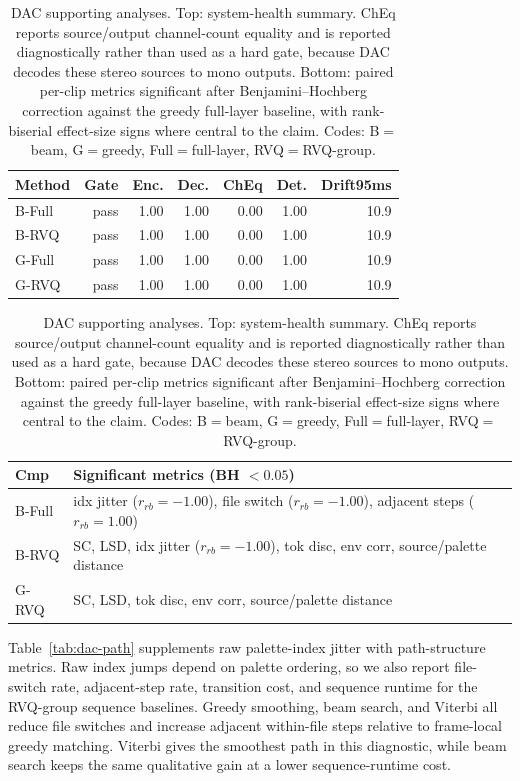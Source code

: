 \documentclass[twoside,a4paper]{article}
\begin{document}
\begin{table}[!t]
    \centering
    \scriptsize
    \caption{DAC supporting analyses. Top: system-health summary. ChEq reports source/output channel-count equality and is reported diagnostically rather than used as a hard gate, because DAC decodes these stereo sources to mono outputs. Bottom: paired per-clip metrics significant after Benjamini--Hochberg correction against the greedy full-layer baseline, with rank-biserial effect-size signs where central to the claim. Codes: B$=$beam, G$=$greedy, Full$=$full-layer, RVQ$=$RVQ-group.}
    \label{tab:dac-support}
    \setlength{\tabcolsep}{2.2pt}
    \begin{tabular}{lrrrrrr}
    \toprule
    Method & Gate & Enc. & Dec. & ChEq & Det. & Drift95ms \\
    \midrule
    B-Full & pass & 1.00 & 1.00 & 0.00 & 1.00 & 10.9 \\
    B-RVQ & pass & 1.00 & 1.00 & 0.00 & 1.00 & 10.9 \\
    G-Full & pass & 1.00 & 1.00 & 0.00 & 1.00 & 10.9 \\
    G-RVQ & pass & 1.00 & 1.00 & 0.00 & 1.00 & 10.9 \\
    \bottomrule
    \end{tabular}

    \vspace{0.35em}
    \setlength{\tabcolsep}{2pt}
    \begin{tabular}{p{}p{}}
    \toprule
    Cmp & Significant metrics (BH $< 0.05$) \\
    \midrule
    B-Full & idx jitter ($r_{rb}=-1.00$), file switch ($r_{rb}=-1.00$), adjacent steps ($r_{rb}=1.00$) \\
    B-RVQ & SC, LSD, idx jitter ($r_{rb}=-1.00$), tok disc, env corr, source/palette distance \\
    G-RVQ & SC, LSD, tok disc, env corr, source/palette distance \\
    \bottomrule
    \end{tabular}
\end{table}

Table~\ref{tab:dac-path} supplements raw palette-index jitter with path-structure metrics. Raw index jumps depend on palette ordering, so we also report file-switch rate, adjacent-step rate, transition cost, and sequence runtime for the RVQ-group sequence baselines. Greedy smoothing, beam search, and Viterbi all reduce file switches and increase adjacent within-file steps relative to frame-local greedy matching. Viterbi gives the smoothest path in this diagnostic, while beam search keeps the same qualitative gain at a lower sequence-runtime cost.
\end{document}
